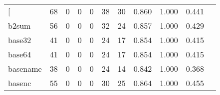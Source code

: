 \begin{longtable}{lp{1.2cm}p{1.2cm}p{1.2cm}p{1.2cm}p{1.2cm}p{1.2cm}p{1.2cm}p{1.2cm}p{1.2cm}p{1.2cm}}
\bottomrule
\endlastfoot
{[}         &                                    68 &                                                  0 &                                                  0 &                                                  0 &                                                 38 &                                                 30 &                                         0.860 &                                              1.000 &                                              0.441 \\
b2sum     &                                    56 &                                                  0 &                                                  0 &                                                  0 &                                                 32 &                                                 24 &                                         0.857 &                                              1.000 &                                              0.429 \\
base32    &                                    41 &                                                  0 &                                                  0 &                                                  0 &                                                 24 &                                                 17 &                                         0.854 &                                              1.000 &                                              0.415 \\
base64    &                                    41 &                                                  0 &                                                  0 &                                                  0 &                                                 24 &                                                 17 &                                         0.854 &                                              1.000 &                                              0.415 \\
basename  &                                    38 &                                                  0 &                                                  0 &                                                  0 &                                                 24 &                                                 14 &                                         0.842 &                                              1.000 &                                              0.368 \\
basenc    &                                    55 &                                                  0 &                                                  0 &                                                  0 &                                                 30 &                                                 25 &                                         0.864 &                                              1.000 &                                              0.455 \\

\end{longtable}
